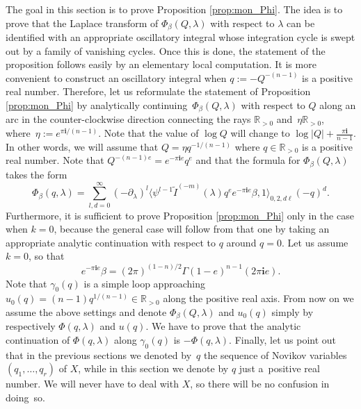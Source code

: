 \documentclass[10pt,a4paper]{article}
\numberwithin{equation}{section}
\newcommand{\RR}{\mathbb{R}}
\newcommand{\ii}{\mathbf{i}}
\begin{document}
The goal in this section is to prove Proposition
\ref{prop:mon_Phi}. The idea is to prove that the Laplace transform of
$\Phi_\beta(Q,\lambda)$ with respect to $\lambda$ can be identified
with an appropriate oscillatory integral whose integration cycle is
swept out by a family of vanishing cycles. Once this is done, the
statement of the proposition follows easily by an elementary local
computation. It is more convenient to construct an oscillatory integral when $q:=-Q^{-(n-1)}$ is a positive real number. Therefore, let us reformulate the statement of Proposition \ref{prop:mon_Phi} by analytically continuing~$\Phi_\beta(Q,\lambda)$ with respect to $Q$ along an arc in the counter-clockwise direction connecting the rays $\RR_{>0}$ and~$\eta \RR_{>0}$, where~$\eta:=e^{\pi\ii/(n-1)}$. Note that the value of $\log Q$ will change to $\log |Q| + \tfrac{\pi\ii}{n-1}$. In other words, we will assume that $Q= \eta q^{-1/(n-1)}$ where $q\in \RR_{>0}$ is a positive real number. Note that $Q^{-(n-1) e}= e^{-\pi\ii e} q^{e}$ and that the formula for $\Phi_\beta(Q,\lambda)$ takes the form
\begin{equation}\label{phi_infty}
\Phi_\beta(q,\lambda)=
\sum_{l,d=0}^\infty
(-\partial_\lambda)^l
\big\langle \psi^{l-1}
\widetilde{I}^{(-m)}(\lambda) q^{e} e^{-\pi\ii e}\beta, 1\big\rangle_{0,2,d\ell} (-q)^d.
\end{equation}
Furthermore, it is sufficient to prove Proposition \ref{prop:mon_Phi} only in the case when $k=0$, because the general case will follow from that one by taking an appropriate analytic continuation with respect to $q$ around $q=0$. Let us assume $k=0$, so that
\[
e^{-\pi\ii e}\beta=
(2\pi)^{(1-n)/2}
\Gamma(1-e)^{n-1}
(2\pi\ii e).
\]
Note that $\gamma_0(q)$ is a simple loop approaching
$u_0(q)=(n-1)q^{1/(n-1)}\in \RR_{>0}$ along the positive real
axis. From now on we assume the above settings and denote
$\Phi_\beta(Q,\lambda)$ and $u_0(q)$ simply by respectively
$\Phi(q,\lambda)$ and $u(q)$. We have to prove that the analytic continuation of $\Phi(q,\lambda)$ along $\gamma_0(q)$ is $-\Phi(q,\lambda)$. Finally, let us point out that in the previous sections we denoted by~$q$ the sequence of Novikov variables $(q_1,\dots,q_r)$ of $X$, while in this section we denote by $q$ just a~positive real number. We will never have to deal with $X$, so there will be no confusion in doing~so.
\end{document}
